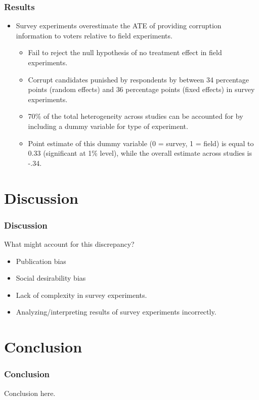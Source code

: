 \documentclass[usenames,dvipsnames]{beamer}
\begin{document}

\begin{frame}
\frametitle{Results}
\begin{itemize}
\item Survey experiments overestimate the ATE of providing corruption information to voters relative to field experiments.
\pause
\begin{itemize}
\item \textcolor{Cerulean}{Fail to reject the null hypothesis} of no treatment effect in field experiments.
\pause
\item Corrupt candidates punished by respondents by between \textcolor{Cerulean}{34 percentage points} (random effects) and \textcolor{Cerulean}{36 percentage points} (fixed effects) in survey experiments.
\pause
\item 70\% of the total heterogeneity across studies can be accounted for by including a dummy variable for type of experiment.
\pause
\item Point estimate of this dummy variable (0 = survey, 1 = field) is equal to 0.33 (significant at 1\% level), while the overall estimate across studies is -.34. 

\end{itemize}
\end{itemize}
\end{frame}

\section{Discussion}

\begin{frame}
\frametitle{Discussion}
What might account for this discrepancy?
\pause
\begin{itemize}
\item Publication bias
\pause
\item Social desirability bias
\pause
\item Lack of complexity in survey experiments.
\pause
\item Analyzing/interpreting results of survey experiments incorrectly. 
\end{itemize}

\end{frame}

\section{Conclusion}

\begin{frame}
\frametitle{Conclusion}
Conclusion here. 
\end{frame}



\end{document}
